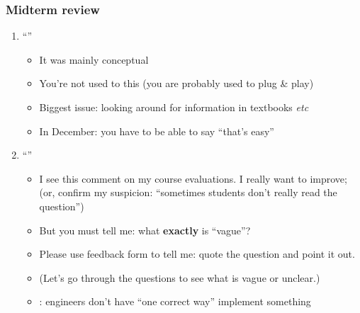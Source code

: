 \begin{frame}\frametitle{Midterm review}
	\begin{enumerate}
		\item	``{\color{myOrange}{It was hard}}''
		\begin{itemize}
			\item	It was mainly conceptual
			\item	You're not used to this (you are probably used to plug \& play)
			\item	Biggest issue: looking around for information in textbooks \emph{etc}
			\item	In December: you have to be able to say {\small ``that's easy''}
		\end{itemize}
		
		\item	``{\color{myOrange}{Questions were vague. It felt like there are multiple answers to the questions}}''
		\begin{itemize}
			\item	I see this comment on my course evaluations. I really want to improve; (or, confirm my suspicion: ``sometimes students don't really read the question'')
			\item	But you must tell me: what \textbf{exactly} is ``vague''?
			\item	Please use feedback form to tell me: quote the question and point it out.
			\item	(Let's go through the questions to see what is vague or unclear.)
			\item	{\color{myBlue}{Note that multiple answers are possible in some open-ended questions}}: engineers don't have ``one correct way'' implement something
		\end{itemize}
	\end{enumerate}
\end{frame}
	
